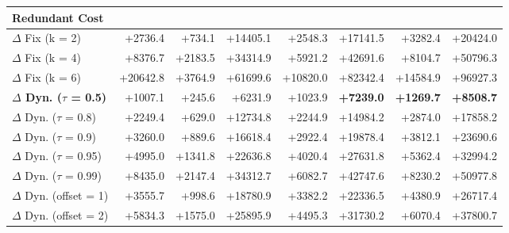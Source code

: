 \begin{table}[t]
{{\begin{tabular}{lrrrrrrr}
\midrule
\textbf{Redundant Cost} & & & & & & &\\
\midrule
$\Delta$ Fix (k = 2) & +2736.4 & +734.1 & +14405.1 & +2548.3 & +17141.5 & +3282.4 & +20424.0 \\
$\Delta$ Fix (k = 4) & +8376.7 & +2183.5 & +34314.9 & +5921.2 & +42691.6 & +8104.7 & +50796.3 \\
$\Delta$ Fix (k = 6) & +20642.8 & +3764.9 & +61699.6 & +10820.0 & +82342.4 & +14584.9 & +96927.3 \\
\hdashline
\textbf{$\Delta$ Dyn. ($\tau$ = 0.5)} & +1007.1 & +245.6 & +6231.9 & +1023.9 & \textbf{+7239.0} & \textbf{+1269.7} & \textbf{+8508.7} \\
$\Delta$ Dyn. ($\tau$ = 0.8) & +2249.4 & +629.0 & +12734.8 & +2244.9 & +14984.2 & +2874.0 & +17858.2 \\
$\Delta$ Dyn. ($\tau$ = 0.9) & +3260.0 & +889.6 & +16618.4 & +2922.4 & +19878.4 & +3812.1 & +23690.6 \\
$\Delta$ Dyn. ($\tau$ = 0.95) & +4995.0 & +1341.8 & +22636.8 & +4020.4 & +27631.8 & +5362.4 & +32994.2 \\
$\Delta$ Dyn. ($\tau$ = 0.99) & +8435.0 & +2147.4 & +34312.7 & +6082.7 & +42747.6 & +8230.2 & +50977.8 \\
\hdashline
$\Delta$ Dyn. (offset = 1) & +3555.7 & +998.6 & +18780.9 & +3382.2 & +22336.5 & +4380.9 & +26717.4 \\
$\Delta$ Dyn. (offset = 2) & +5834.3 & +1575.0 & +25895.9 & +4495.3 & +31730.2 & +6070.4 & +37800.7 \\
\bottomrule
\end{tabular}
}
}
\end{table}
